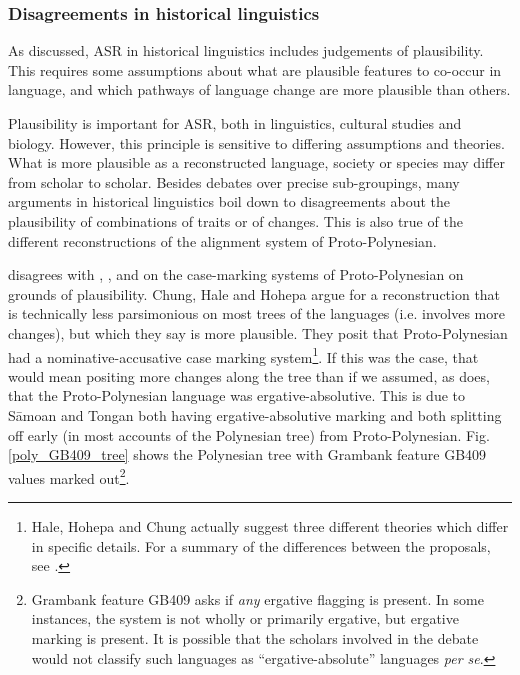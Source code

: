 \documentclass[12pt,letterpaper]{article}
\begin{document}

\FloatBarrier
\subsubsection{Disagreements in historical linguistics}
\label{sec:hl_disagreements}
As discussed, ASR in historical linguistics includes judgements of plausibility. This requires some assumptions about what are plausible features to co-occur in language, and which pathways of language change are more plausible than others. 

Plausibility is important for ASR, both in linguistics, cultural studies and biology. However, this principle is sensitive to differing assumptions and theories. What is more plausible as a reconstructed language, society or species may differ from scholar to scholar. Besides debates over precise sub-groupings, many arguments in historical linguistics boil down to disagreements about the plausibility of combinations of traits or of changes. This is also true of the different reconstructions of the alignment system of Proto-Polynesian.

\citet{clark1973aspects} disagrees with \citet{hale_1968}, \citet{hohepa_1969}, and \citet{chung1978} on the case-marking systems of Proto-Polynesian on grounds of plausibility. Chung, Hale and Hohepa argue for a reconstruction that is technically less parsimonious on most trees of the languages (i.e. involves more changes), but which they say is more plausible. They posit that Proto-Polynesian had a nominative-accusative case marking system\footnote{Hale, Hohepa and Chung actually suggest three different theories which differ in specific details. For a summary of the differences between the proposals, see \citet[247-249]{chung1978}.}. If this was the case, that would mean positing more changes along the tree than if we assumed, as \citet{clark1973aspects} does, that the Proto-Polynesian language was ergative-absolutive. This is due to S\={a}moan and Tongan both having ergative-absolutive marking and both splitting off early (in most accounts of the Polynesian tree) from Proto-Polynesian. Fig. \ref{poly_GB409_tree} shows the Polynesian tree with Grambank feature GB409 values marked out\footnote{Grambank feature GB409 asks if \emph{any} ergative flagging is present. In some instances, the system is not wholly or primarily ergative, but ergative marking is present. It is possible that the scholars involved in the debate would not classify such languages as ``ergative-absolute'' languages \emph{per se}.}.
\end{document}
